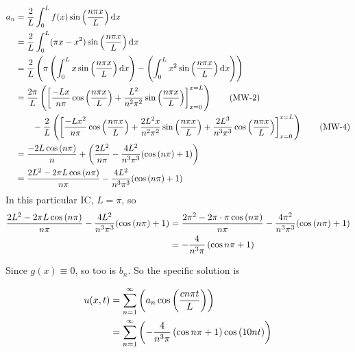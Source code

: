 \begin{align*}
    a_n &=  \frac{2}{L} \intl f(x) \sinp{\npxl} \dd x \\
    &=  \frac{2}{L} \int_{0}^{L} (\pi x - x^2) \sinp{\npxl} \dd x \\
    &=  \frac{2}{L}  \pars{
        \pi \pars{
            \int_{0}^{L} x \sinp{\npxl} \dd x
        } - \pars{
            \int_{0}^{L}  x^2 \sinp{\npxl} \dd x
        }
    }\\
    &= \frac{2 \pi}{L}  \pars{
            \brac{ \frac{-Lx}{n \pi} \cosp{\npxl} + \frac{L^2}{n^2 \pi^2} \sinp{\npxl}}_{x=0}^{x=L}
        } \tag {MW-2}\\ & \qquad  -\frac{2}{L}  \pars{ 
            \brac{
                \onp{-Lx^2} \cosp{\npxl} 
                + \onps{2L^2x} \sinp{\npxl} + \onpc{2L^3} \cosp{\npxl}
            }_{x=0}^{x=L}  
    } \tag{MW-4}\\
    &= \frac{-2 L \cosp{\np}}{n} + \pars{\frac{2L^2}{\np} - \frac{4L^2}{n^3 \pi^3} (\cosp{\np} + 1) }\\
    &= \frac{2L^2 -2 \pi L \cosp{\np}}{\np} - \frac{4L^2}{n^3 \pi^3} (\cosp{\np} + 1)
\end{align*}
In this particular IC, $L = \pi$, so
\begin{align*}
    \frac{2L^2 -2 \pi L \cosp{\np}}{\np} - \frac{4L^2}{n^3 \pi^3} (\cosp{\np} + 1)
    &= \frac{2 \pi^2 -2 \pi \cdot \pi \cosp{\np}}{\np} - \frac{4 \pi^2}{n^3 \pi^3} (\cosp{\np} + 1)\\
    &= -\frac{4}{n^3 \pi} \pars{ \cos{\np} + 1 }
\end{align*}


\nnl Since $g(x) \equiv 0$, so too is $b_n$. So the specific solution is 

\begin{align*}
    u(x,t) &= \sumn{1} \pars{ a_n \cosp{\cunt}}\\
    &= \sumn{1} \pars{ -\frac{4}{n^3 \pi} \pars{ \cos{\np} + 1 } \cosp{10n t}}
\end{align*}
